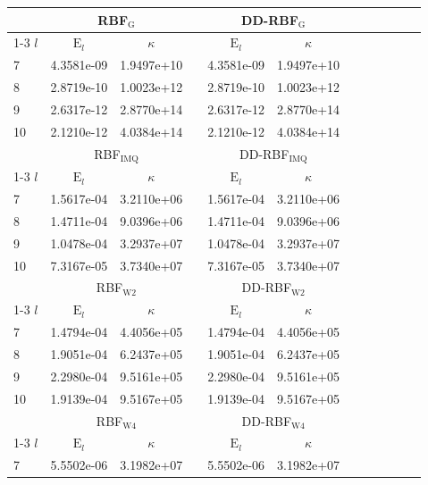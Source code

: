 \documentclass[preprint]{elsarticle}       %
\begin{document}
\begin{table}[!ht]
\begin{center}
\begin{tabular}{lccccccccccc}
& \multicolumn{2}{c}{RBF$_{\text{G}}$} & &   \multicolumn{2}{c}{DD-RBF$_{\text{G}}$}\\ \cline{1-3} \cline{5-7} $l$ & $\text{E}_l$  &$\kappa$ & &$\text{E}_l$ &  $\kappa$ \\
7 &4.3581e-09 & 1.9497e+10 && 4.3581e-09 & 1.9497e+10 && \\
8 &2.8719e-10 & 1.0023e+12 && 2.8719e-10 & 1.0023e+12 && \\
9 &2.6317e-12 & 2.8770e+14 && 2.6317e-12 & 2.8770e+14 && \\
10 &2.1210e-12 & 4.0384e+14 && 2.1210e-12 & 4.0384e+14 && \\
\hline
\hline
& \multicolumn{2}{c}{RBF$_{\text{IMQ}}$} & &   \multicolumn{2}{c}{DD-RBF$_{\text{IMQ}}$}\\ \cline{1-3} \cline{5-7} $l$ & $\text{E}_l$ & $\kappa$ & &$\text{E}_l$ & $\kappa$ \\
7 &1.5617e-04 & 3.2110e+06 && 1.5617e-04 & 3.2110e+06 && \\
8 &1.4711e-04 & 9.0396e+06 && 1.4711e-04 & 9.0396e+06 && \\
9 &1.0478e-04 & 3.2937e+07 && 1.0478e-04 & 3.2937e+07 && \\
10 &7.3167e-05 & 3.7340e+07 && 7.3167e-05 & 3.7340e+07 && \\
\hline
\hline
& \multicolumn{2}{c}{RBF$_{\text{W2}}$} & &   \multicolumn{2}{c}{DD-RBF$_{\text{W2}}$}\\ \cline{1-3} \cline{5-7} $l$ & $\text{E}_l$ & $\kappa$ & &$\text{E}_l$ & $\kappa$ \\
7 &1.4794e-04 & 4.4056e+05 && 1.4794e-04 & 4.4056e+05 && \\
8 &1.9051e-04 & 6.2437e+05 && 1.9051e-04 & 6.2437e+05 && \\
9 &2.2980e-04 & 9.5161e+05 && 2.2980e-04 & 9.5161e+05 && \\
10 &1.9139e-04 & 9.5167e+05 && 1.9139e-04 & 9.5167e+05 && \\
\hline
\hline
& \multicolumn{2}{c}{RBF$_{\text{W4}}$} & &   \multicolumn{2}{c}{DD-RBF$_{\text{W4}}$}\\ \cline{1-3} \cline{5-7} $l$ & $\text{E}_l$ & $\kappa$ & &$\text{E}_l$ & $\kappa$ \\
7 &5.5502e-06 & 3.1982e+07 && 5.5502e-06 & 3.1982e+07 && \\

\end{tabular}
\end{center}
\end{table}
\end{document}
